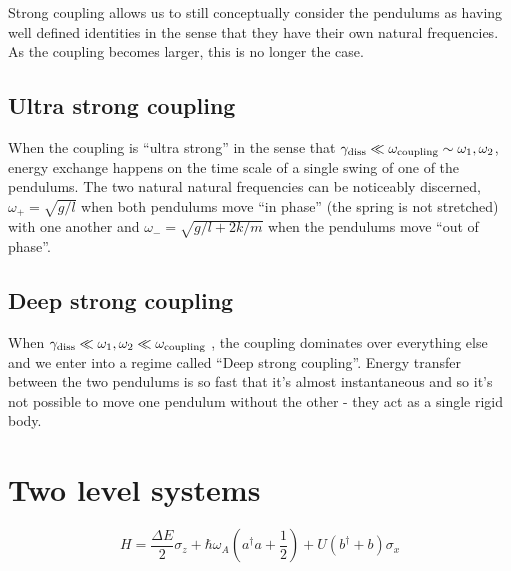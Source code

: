 \documentclass[
]{article}
\renewcommand{\[}{\begin{equation}}
\renewcommand{\]}{\end{equation}}
\begin{document}
Strong coupling allows us to still conceptually consider the pendulums
as having well defined identities in the sense that they have their own
natural frequencies. As the coupling becomes larger, this is no longer
the case.

\subsection{Ultra strong coupling}\label{ultra-strong-coupling}

When the coupling is ``ultra strong'' in the sense that
\(\gamma_{\rm diss} \ll \omega_{\rm coupling} \sim \omega_1,\omega_2\),
energy exchange happens on the time scale of a single swing of one of
the pendulums. The two natural natural frequencies can be noticeably
discerned, \(\omega_+ = \sqrt{g/l}\) when both pendulums move ``in
phase'' (the spring is not stretched) with one another and
\(\omega_- = \sqrt{g/l + 2k/m}\) when the pendulums move ``out of
phase''.

\subsection{Deep strong coupling}\label{deep-strong-coupling}

When
\(\gamma_{\rm diss} \ll \omega_1,\omega_2 \ll \omega_{\rm coupling}\) ,
the coupling dominates over everything else and we enter into a regime
called ``Deep strong coupling''. Energy transfer between the two
pendulums is so fast that it's almost instantaneous and so it's not
possible to move one pendulum without the other - they act as a single
rigid body.

\section{Two level systems}\label{two-level-systems}

\[
H = \frac{\Delta E}{2} \sigma_z + \hbar\omega_A\left(a^{\dagger}a +\frac{1}{2}\right) + U\left( b^{\dagger} + b \right)\sigma_x
\]

\printbibliography
\end{document}
